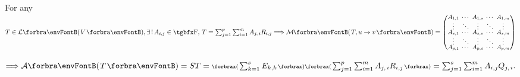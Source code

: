For any $T\in\Lm{V},\exists\,!\,A_{i,j}\in{}\Fbb,\,T=\textstyle\sum_{j=1}^p\sum_{i=1}^m A_{j,\,i}R_{i,j}\Longrightarrow\Mt{T,u\rightarrow v}={\small\begin{pmatrix}
		A_{1,1} &\hspace{-6pt} \cdots &\hspace{-6pt} A_{1,s} &\hspace{-6pt} \cdots &\hspace{-6pt} A_{1,m}\\[-2pt]
		\vdots  &\hspace{-6pt} \ddots &\hspace{-6pt} \vdots  &\hspace{-6pt} \ddots &\hspace{-6pt} \vdots\\[-4pt]
		A_{s,1} &\hspace{-6pt} \cdots &\hspace{-6pt} A_{s,s} &\hspace{-6pt} \cdots &\hspace{-6pt} A_{s,m}\\[-2pt]
		\vdots  &\hspace{-6pt} \ddots &\hspace{-6pt} \vdots  &\hspace{-6pt} \ddots &\hspace{-6pt} \vdots\\[-4pt]
		A_{p,1} &\hspace{-6pt} \cdots &\hspace{-6pt} A_{p,s} &\hspace{-6pt} \cdots &\hspace{-6pt} A_{p,m}
\end{pmatrix}}$\par\vspace{-20pt}\quad
$\Longrightarrow\mA\Par{T}=ST=\textstyle\XPar{{\sum_{k=1}^sE_{k,k}}}\XPar{{\textstyle\sum_{j=1}^p\sum_{i=1}^m A_{j,\,i}R_{i,j}}}=\textstyle\sum_{j=1}^s\sum_{i=1}^m A_{i,j}Q_{j,\,i}.$\par\hspace{0pt}

